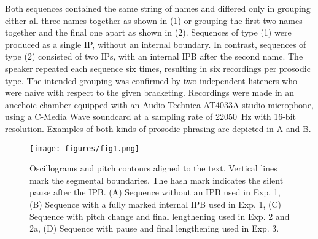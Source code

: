 \documentclass[output=paper]{langscibook}
\begin{document}
Both sequences contained the same string of names and differed only in grouping either all three names together as shown in (1) or grouping the first two names together and the final one apart as shown in (2). Sequences of type (1) were produced as a single IP, without an internal boundary. In contrast, sequences of type (2) consisted of two IPs, with an internal IPB after the second name. The speaker repeated each sequence six times, resulting in six recordings per prosodic type. The intended grouping was confirmed by two independent listeners who were naïve with respect to the given bracketing. Recordings were made in an anechoic chamber equipped with an Audio-Technica AT4033A studio microphone, using a C-Media Wave soundcard at a sampling rate of \qty[group-separator={,},group-digits=all]{22050}{\hertz} with 16-bit resolution. Examples of both kinds of prosodic phrasing are depicted in A and B.
 


\begin{figure}%
\texttt{[image: figures/fig1.png]}
\caption{Oscillograms and pitch contours aligned to the text. Vertical lines mark the segmental boundaries. The hash mark indicates the silent pause after the IPB. (A) Sequence without an IPB used in Exp. 1, (B) Sequence with a fully marked internal IPB used in Exp. 1, (C) Sequence with pitch change and final lengthening used in Exp. 2 and 2a, (D) Sequence with pause and final lengthening used in Exp. 3.}
 \label{fig1}
\end{figure}
\end{document}
